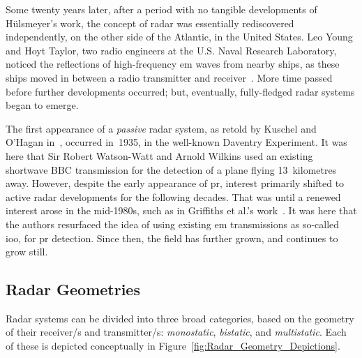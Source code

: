 \documentclass[class=report,11pt,crop=false]{standalone}
\begin{document}
Some twenty years later, after a period with no tangible developments of H\"ulsmeyer's work, the concept of radar was essentially rediscovered independently, on the other side of the Atlantic, in the United States. Leo Young and Hoyt Taylor, two radio engineers at the U.S. Naval Research Laboratory, noticed the reflections of high-frequency \gls{em} waves from nearby ships, as these ships moved in between a radio transmitter and receiver~\cite{brown1999technical}. More time passed before further developments occurred; but, eventually, fully-fledged radar systems began to emerge.

The first appearance of a \emph{passive} radar system, as retold by Kuschel and O'Hagan in~\cite{kuschel-hagan-history}, occurred in~1935, in the well-known Daventry Experiment. It was here that Sir Robert Watson-Watt and Arnold Wilkins used an existing shortwave BBC transmission for the detection of a plane flying 13~kilometres away. However, despite the early appearance of \gls{pr}, interest primarily shifted to active radar developments for the following decades. That was until a renewed interest arose in the mid-1980s, such as in Griffiths et al.'s work~\cite{Griffiths1986}. It was here that the authors resurfaced the idea of using existing \gls{em} transmissions as so-called \gls{ioo}, for \gls{pr} detection. Since then, the field has further grown, and continues to grow still.

\subsection{Radar Geometries}
Radar systems can be divided into three broad categories, based on the geometry of their receiver/s and transmitter/s: \emph{monostatic}, \emph{bistatic}, and \emph{multistatic}. Each of these is depicted conceptually in Figure~\ref{fig:Radar_Geometry_Depictions}.
\end{document}
